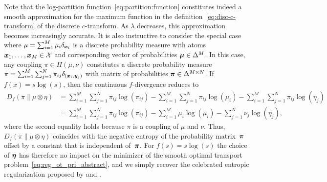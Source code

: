 \documentclass[11pt, a4paper, oneside, reqno]{article}
\begin{document}
	Note that the log-partition function~\eqref{eq:partition:function} constitutes indeed a smooth approximation for the maximum function in the definition~\eqref{eq:disc-c-transform} of the discrete $c$-transform. As $\lambda$ decreases, this approximation becomes increasingly accurate. It is also instructive to consider the special case where $\mu=\sum_{i=1}^M\mu_i\delta_{\boldsymbol x_i}$ is a discrete probability measure with atoms $\boldsymbol x_1,\ldots,\boldsymbol x_M\in\mathcal{X}$ and corresponding vector of probabilities $\boldsymbol \mu\in \Delta^M$. In this case, any coupling $\pi\in\Pi(\mu,\nu)$ constitutes a discrete probability measure $\pi=\sum_{i=1}^M\sum_{j=1}^N \pi_{ij}\delta_{(\boldsymbol x_i,\boldsymbol y_j)}$ with matrix of probabilities $\boldsymbol 
	\pi\in\Delta^{M\times N}$. If $f(x)=s\log(s)$, then the continuous $f$-divergence reduces to
	\begin{align*}
	D_f(\pi \| \mu \otimes \eta)&=\sum_{i=1}^M\sum_{j=1}^N \pi_{ij}\log(\pi_{ij})-\sum_{i=1}^M\sum_{j=1}^N \pi_{ij}\log(\mu_i)-\sum_{i=1}^M\sum_{j=1}^N \pi_{ij}\log(\eta_j)\\ 
	&=\sum_{i=1}^M\sum_{j=1}^N \pi_{ij}\log(\pi_{ij})-\sum_{i=1}^M\mu_i\log(\mu_i)-\sum_{j=1}^N \nu_j\log(\eta_j),
	\end{align*}
	where the second equality holds because $\pi$ is a coupling of $\mu$ and $\nu$. Thus, $D_f(\pi \| \mu \otimes \eta)$ coincides with the negative entropy of the probability matrix~$\boldsymbol \pi$ offset by a constant that is independent of~$\boldsymbol \pi$. For $f(s)=s\log(s)$ the choice of $\boldsymbol \eta$ has therefore no impact on the minimizer of the smooth optimal transport problem~\eqref{eq:reg_ot_pri_abstract}, and we simply recover the celebrated entropic regularization proposed by \citet{sinkhorn, genevay2016stochastic, rigollet2018entropic, peyre2019computational} and \cite{ref:clason2019entropic}. 
	
	
	
	
\end{document}
